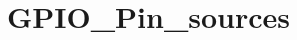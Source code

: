 \hypertarget{group___g_p_i_o___pin__sources}{\section{G\-P\-I\-O\-\_\-\-Pin\-\_\-sources}
\label{group___g_p_i_o___pin__sources}
}

